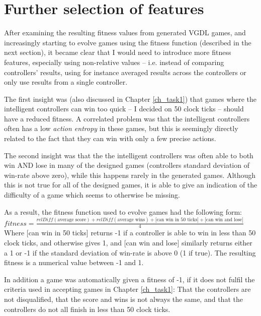 \documentclass[a4paper,titlepage,final]{report}
\begin{document}


\section{Further selection of features}
\label{sec_task2furtherfeatures}

After examining the resulting fitness values from generated VGDL games, and increasingly starting to evolve games using the fitness function (described in the next section), it became clear that I would need to introduce more fitness features, especially using non-relative values -- i.e. instead of comparing controllers' results, using for instance averaged results across the controllers or only use results from a single controller.

The first insight was (also discussed in Chapter \ref{ch_task1}) that games where the intelligent controllers can win too quick -- I decided on 50 clock ticks -- should have a reduced fitness.
A correlated problem was that the intelligent controllers often has a low \textit{action entropy} in these games, but this is seemingly directly related to the fact that they can win with only a few precise actions.

The second insight was that the the intelligent controllers was often able to both win AND lose in many of the designed games (controllers standard deviation of win-rate above zero), while this happens rarely in the generated games. 
Although this is not true for all of the designed games, it is able to give an indication of the difficulty of a game which seems to otherwise be missing.

As a result, the fitness function used to evolve games had the following form: \\

$fitness = \frac{relDiff(\text{average score}) + relDiff(\text{average wins}) + \text{[can win in 50 ticks]} + \text{[can win and lose]}}{4}$ \\

Where [can win in 50 ticks] returns -1 if a  controller is able to win in less than 50 clock ticks, and otherwise gives 1, and [can win and lose] similarly returns either a 1 or -1 if the standard deviation of win-rate is above 0 (1 if true).
The resulting fitness is a numerical value between -1 and 1.

In addition a game was automatically given a fitness of -1, if it does not fulfil the criteria used in accepting games in Chapter \ref{ch_task1}: 
That the controllers are not disqualified, that the score and wins is not always the same, and that the controllers do not all finish in less than 50 clock ticks.
\end{document}
